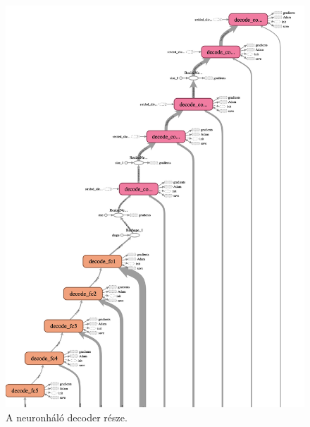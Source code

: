 \begin{figure}[p]
    \includegraphics{src/images/tensorflow_graph_decode.png}
    \caption{A neuronháló decoder része.}
\end{figure}

